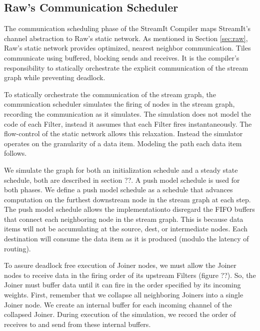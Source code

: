 
\subsection{Raw's Communication Scheduler}
\label{sec:rawcommunic}

The communication scheduling phase of the StreamIt Compiler maps
StreamIt's channel abstraction to Raw's static network.  As mentioned
in Section \ref{sec:raw}, Raw's static network provides optimized, nearest
neighbor communication.  Tiles communicate using buffered, blocking
sends and receives.  It is the compiler's responsibility to statically
orchestrate the explicit communication of the stream graph while
preventing deadlock.

To statically orchestrate the communication of the stream graph, the
communication scheduler simulates the firing of nodes in the stream
graph, recording the communication as it simulates.  The simulation
does not model the code of each Filter, instead it assumes that each
Filter fires instantaneously.  The flow-control of the static network
allows this relaxation.  Instead the simulator operates on the
granularity of a data item.  Modeling the path each data item follows.

We simulate the graph for both an initialization schedule and a steady
state schedule, both are described in section ??.  A push model
schedule is used for both phases.  We define a push model schedule as
a schedule that advances computation on the furthest downstream node
in the stream graph at each step.  The push model schedule allows the
implementationto disregard the FIFO buffers that connect each neighboring
node in the stream graph.  This is because data items will not be
accumulating at the source, dest, or intermediate nodes.  
Each destination will consume the data
item as it is produced (modulo the latency of routing).

To assure deadlock free execution of Joiner nodes, we must allow the
Joiner nodes to receive data in the firing order of its upstream
Filters (figure ??). So, the Joiner must buffer data until it can fire
in the order specified by its incoming weights.  First, remember that
we collapse all neighboring Joiners into a single Joiner node.
We create an internal buffer for each
incoming channel of the collapsed Joiner.  During execution of the
simulation, we record the order of receives to and send from these
internal buffers.

